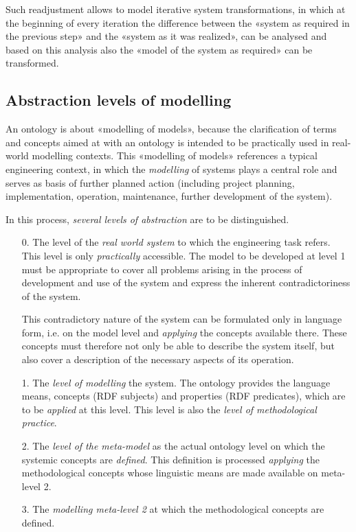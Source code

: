 \documentclass[11pt,a4paper]{article}
\begin{document}
Such readjustment allows to model iterative system transformations, in which
at the beginning of every iteration the difference between the «system as
required in the previous step» and the «system as it was realized», can be
analysed and based on this analysis also the «model of the system as required»
can be transformed.

\subsection{Abstraction levels of modelling}

An ontology is about «modelling of models», because the clarification of terms
and concepts aimed at with an ontology is intended to be practically used in
real-world modelling contexts.  This «modelling of models» references a
typical engineering context, in which the \emph{modelling} of systems plays a
central role and serves as basis of further planned action (including project
planning, implementation, operation, maintenance, further development of the
system).

In this process, \emph{several levels of abstraction} are to be
distinguished. 
\begin{itemize}[noitemsep]
\item [0.] The level of the \emph{real world system} to which the engineering
  task refers. This level is only \emph{practically} accessible. The model to
  be developed at level 1 must be appropriate to cover all problems arising in
  the process of development and use of the system and express the inherent
  contradictoriness of the system.

  This contradictory nature of the system can be formulated only in language
  form, i.e. on the model level and \emph{applying} the concepts available
  there.  These concepts must therefore not only be able to describe the
  system itself, but also cover a description of the necessary aspects of its
  operation.
\item[1.] The \emph{level of modelling} the system. The ontology provides the
  language means, concepts (RDF subjects) and properties (RDF predicates),
  which are to be \emph{applied} at this level. This level is also the
  \emph{level of methodological practice}.
\item[2.] The \emph{level of the meta-model} as the actual ontology level on
  which the systemic concepts are \emph{defined}. This definition is processed
  \emph{applying} the methodological concepts whose linguistic means are made
  available on meta-level 2.
\item [3.] The \emph{modelling meta-level 2} at which the methodological
  concepts are defined.
\end{itemize}
\end{document}
